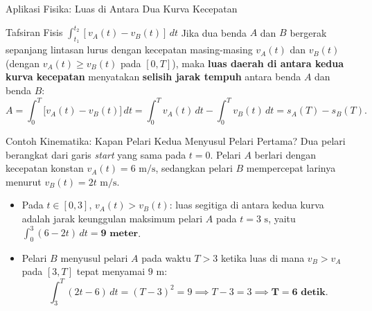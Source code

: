 \documentclass[aspectratio=43,10pt]{beamer}
\begin{document}
\begin{frame}{Aplikasi Fisika: Luas di Antara Dua Kurva Kecepatan}
    \begin{block}{Tafsiran Fisis $\int_{t_1}^{t_2} [v_A(t) - v_B(t)]\,dt$}
        \scriptsize
        Jika dua benda $A$ dan $B$ bergerak sepanjang lintasan lurus dengan kecepatan masing-masing $v_A(t)$ dan $v_B(t)$ (dengan $v_A(t) \ge v_B(t)$ pada $[0, T]$), maka \textbf{luas daerah di antara kedua kurva kecepatan} menyatakan \textbf{selisih jarak tempuh} antara benda $A$ dan benda $B$:
        $$A = \int_{0}^{T} \big[v_A(t) - v_B(t)\big]\,dt = \int_{0}^{T} v_A(t)\,dt - \int_{0}^{T} v_B(t)\,dt = s_A(T) - s_B(T).$$
    \end{block}

    \begin{exampleblock}{Contoh Kinematika: Kapan Pelari Kedua Menyusul Pelari Pertama?}
        \scriptsize\abovedisplayskip=2pt\belowdisplayskip=2pt
        Dua pelari berangkat dari garis \textit{start} yang sama pada $t = 0$. Pelari $A$ berlari dengan kecepatan konstan $v_A(t) = 6\text{ m/s}$, sedangkan pelari $B$ mempercepat larinya menurut $v_B(t) = 2t\text{ m/s}$.
        \begin{itemize}\itemsep=1pt
            \item Pada $t \in [0, 3]$, $v_A(t) > v_B(t)$: luas segitiga di antara kedua kurva adalah jarak keunggulan maksimum pelari $A$ pada $t = 3\text{ s}$, yaitu $\int_0^3 (6 - 2t)\,dt = \mathbf{9\text{ meter}}$.
            \item Pelari $B$ menyusul pelari $A$ pada waktu $T > 3$ ketika luas di mana $v_B > v_A$ pada $[3, T]$ tepat menyamai $9\text{ m}$:
            $$\int_{3}^{T} (2t - 6)\,dt = (T - 3)^2 = 9 \implies T - 3 = 3 \implies \mathbf{T = 6\text{ detik}}.$$
        \end{itemize}
    \end{exampleblock}
\end{frame}
\end{document}
